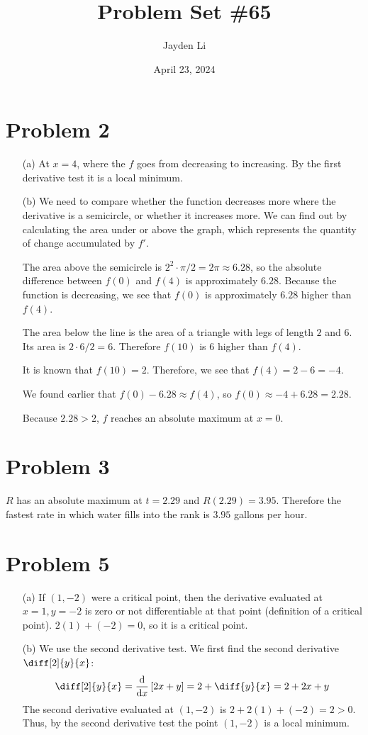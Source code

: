 \documentclass{article}
\title{Problem Set \#65}
\author{Jayden Li}
\date{April 23, 2024}
\newcommand*{\problem}[1]{\section*{Problem #1}}
\newcommand*{\Deriv}[2][x]{\ensuremath{\dfrac{\mathrm{d}}{\mathrm{d}#1}\left[#2\right]}}
\begin{document}
\fontsize{12pt}{12pt}\selectfont
\setlength{\abovedisplayskip}{0pt}
\maketitle

\problem{2}
\begin{itemize}
	\item[(a)]
	At $x=4$, where the $f$ goes from decreasing to increasing. By the first derivative test it is a local minimum.

	\item[(b)]
	We need to compare whether the function decreases more where the derivative is a semicircle, or whether it increases more. We can find out by calculating the area under or above the graph, which represents the quantity of change accumulated by $f'$.
	
	The area above the semicircle is $2^2\cdot\pi/2=2\pi\approx6.28$, so the absolute difference between $f(0)$ and $f(4)$ is approximately $6.28$. Because the function is decreasing, we see that $f(0)$ is approximately $6.28$ higher than $f(4)$.

	The area below the line is the area of a triangle with legs of length $2$ and $6$. Its area is $2\cdot6/2=6$. Therefore $f(10)$ is $6$ higher than $f(4)$.

	It is known that $f(10)=2$. Therefore, we see that $f(4)=2-6=-4$.

	We found earlier that $f(0)-6.28\approx f(4)$, so $f(0)\approx-4+6.28=2.28$.

	Because $2.28>2$, $f$ reaches an absolute maximum at $x=0$.
\end{itemize}

\problem{3}
$R$ has an absolute maximum at $t=2.29$ and $R(2.29)=3.95$. Therefore the fastest rate in which water fills into the rank is $3.95$ gallons per hour.

\problem{5}
\begin{itemize}
	\item[(a)]
	If $(1,-2)$ were a critical point, then the derivative evaluated at $x=1,y=-2$ is zero or not differentiable at that point (definition of a critical point). $2(1)+(-2)=0$, so it is a critical point.

	\item[(b)] 
	We use the second derivative test. We first find the second derivative $\diff[2]{y}{x}$:
	\begin{equation*}
		\diff[2]{y}{x}=\Deriv{2x+y}=2+\diff{y}{x}=2+2x+y
	\end{equation*}
	The second derivative evaluated at $(1,-2)$ is $2+2(1)+(-2)=2>0$. Thus, by the second derivative test the point $(1,-2)$ is a local minimum.
\end{itemize}
\end{document}
